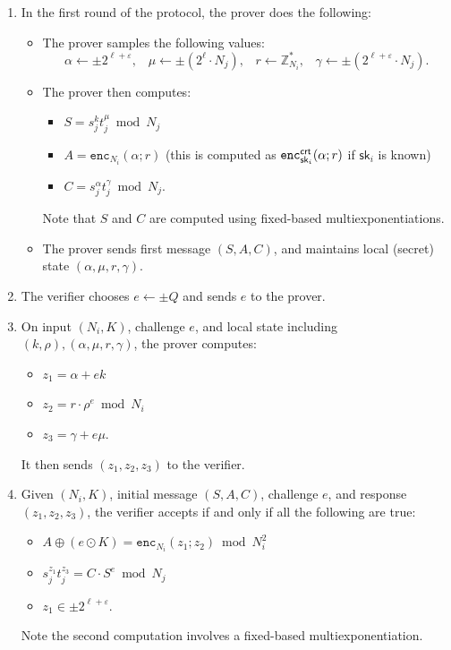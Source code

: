 \documentclass[11pt]{article}
\def\crt{{\sf crt}}
\newcommand{\enc}{\ensuremath{\mathtt{enc}}}
\newcommand{\commit}[1]{\ensuremath{\mathtt{Commit}_{\mathtt{#1}}}}
\newcommand{\sk}{\textsf{sk}}
\newcommand{\Z}{\mathbb{Z}}
\newcommand{\?}[1]{\stackrel{?}{#1}}
\begin{document}
\begin{enumerate}
    \item In the first round of the protocol, the prover does the following:
    \begin{itemize}
        \item The prover  samples the following values:
        \[\alpha \gets \pm 2^{\ell + \varepsilon}, \;\;\;
        \mu \gets \pm (2^\ell \cdot N_j), \;\;\;
        r \gets \Z_{N_i}^*, \;\;\;
        \gamma \gets \pm (2^{\ell + \varepsilon} \cdot N_j).\]

        \item The prover then computes:
\begin{itemize}
        \item $S = s_j^k t_j^\mu \bmod N_j$ 
            \item $A = \enc_{N_i}(\alpha; r)$  (this is computed as $\enc^\crt_{\sk_i}(\alpha; r)$ if $\sk_i$ is known)
            \item $C = s_j^\alpha t_j^\gamma \bmod N_j$.
\end{itemize}
      Note that $S$ and $C$ are computed using fixed-based multiexponentiations.
        

        \item The prover sends first message $(S, A, C)$, and maintains local (secret) state $(\alpha, \mu, r, \gamma)$.
    \end{itemize}

    \item The verifier chooses $e \gets \pm Q$ and sends $e$ to the prover.

    \item On input $(N_i, K)$, challenge $e$, and local state including $(k, \rho), (\alpha, \mu, r, \gamma)$, the prover computes:
\begin{itemize}
\item    $z_1 = \alpha + e k $
\item    $z_2 = r \cdot \rho^e \bmod N_i $
\item    $z_3 = \gamma + e \mu$.
\end{itemize}
    It then sends $(z_1, z_2, z_3)$ to the verifier.

    \item Given $(N_i, K)$, initial message $(S, A, C)$, challenge $e$, and response $(z_1, z_2, z_3)$, the verifier accepts if and only if all the following are true:
\begin{itemize}
\item $A \oplus (e \odot K) = \enc_{N_i}(z_1; z_2) \bmod N_i^2$ %
\item    $s_j^{z_1} t_j^{z_3} = C \cdot S^e \bmod N_j$  
\item    $z_1 \in \pm 2^{\ell + \varepsilon}$.
\end{itemize}
Note the second computation involves a fixed-based multiexponentiation.
\end{enumerate}
\end{document}
